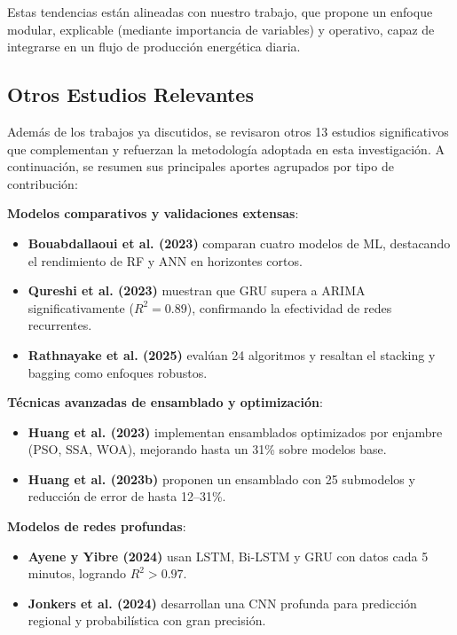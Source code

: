\documentclass[conference]{IEEEtran}
\begin{document}
	Estas tendencias están alineadas con nuestro trabajo, que propone un enfoque modular, explicable (mediante importancia de variables) y operativo, capaz de integrarse en un flujo de producción energética diaria.
	
	\subsection{Otros Estudios Relevantes}
	
	Además de los trabajos ya discutidos, se revisaron otros 13 estudios significativos que complementan y refuerzan la metodología adoptada en esta investigación. A continuación, se resumen sus principales aportes agrupados por tipo de contribución:
	
	\textbf{Modelos comparativos y validaciones extensas}:
	\begin{itemize}[leftmargin=*,itemsep=1pt]
		\item \textbf{Bouabdallaoui et al. (2023)} comparan cuatro modelos de ML, destacando el rendimiento de RF y ANN en horizontes cortos.
		\item \textbf{Qureshi et al. (2023)} muestran que GRU supera a ARIMA significativamente (\(R^2 = 0.89\)), confirmando la efectividad de redes recurrentes.
		\item \textbf{Rathnayake et al. (2025)} evalúan 24 algoritmos y resaltan el stacking y bagging como enfoques robustos.
	\end{itemize}
	
	\textbf{Técnicas avanzadas de ensamblado y optimización}:
	\begin{itemize}[leftmargin=*,itemsep=1pt]
		\item \textbf{Huang et al. (2023)} implementan ensamblados optimizados por enjambre (PSO, SSA, WOA), mejorando hasta un 31\% sobre modelos base.
		\item \textbf{Huang et al. (2023b)} proponen un ensamblado con 25 submodelos y reducción de error de hasta 12–31\%.
	\end{itemize}
	
	\textbf{Modelos de redes profundas}:
	\begin{itemize}[leftmargin=*,itemsep=1pt]
		\item \textbf{Ayene y Yibre (2024)} usan LSTM, Bi-LSTM y GRU con datos cada 5 minutos, logrando \(R^2 > 0.97\).
		\item \textbf{Jonkers et al. (2024)} desarrollan una CNN profunda para predicción regional y probabilística con gran precisión.
	\end{itemize}
	
\end{document}
